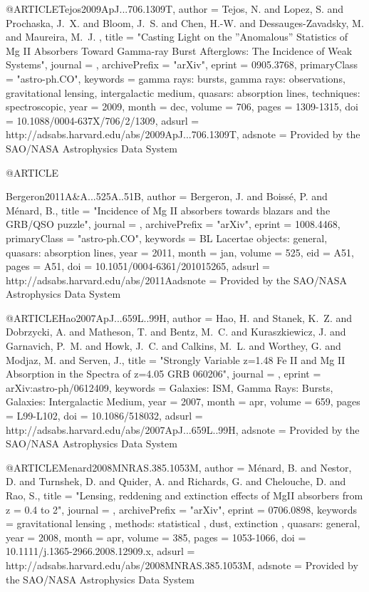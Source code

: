 \documentclass[twocolumn]{aastex62}
\begin{document}
{{{{{{{{{{{@ARTICLE{Tejos2009ApJ...706.1309T,
   author = {{Tejos}, N. and {Lopez}, S. and {Prochaska}, J.~X. and {Bloom}, J.~S. and 
	{Chen}, H.-W. and {Dessauges-Zavadsky}, M. and {Maureira}, M.~J.
	},
    title = "{Casting Light on the ''Anomalous'' Statistics of Mg II Absorbers Toward Gamma-ray Burst Afterglows: The Incidence of Weak Systems}",
  journal = {\apj},
archivePrefix = "arXiv",
   eprint = {0905.3768},
 primaryClass = "astro-ph.CO",
 keywords = {gamma rays: bursts, gamma rays: observations, gravitational lensing, intergalactic medium, quasars: absorption lines, techniques: spectroscopic},
     year = 2009,
    month = dec,
   volume = 706,
    pages = {1309-1315},
      doi = {10.1088/0004-637X/706/2/1309},
   adsurl = {http://adsabs.harvard.edu/abs/2009ApJ...706.1309T},
  adsnote = {Provided by the SAO/NASA Astrophysics Data System}
}


@ARTICLE{Bergeron2011A&A...525A..51B,
   author = {{Bergeron}, J. and {Boiss{\'e}}, P. and {M{\'e}nard}, B.},
    title = "{Incidence of Mg II absorbers towards blazars and the GRB/QSO puzzle}",
  journal = {\aap},
archivePrefix = "arXiv",
   eprint = {1008.4468},
 primaryClass = "astro-ph.CO",
 keywords = {BL Lacertae objects: general, quasars: absorption lines},
     year = 2011,
    month = jan,
   volume = 525,
      eid = {A51},
    pages = {A51},
      doi = {10.1051/0004-6361/201015265},
   adsurl = {http://adsabs.harvard.edu/abs/2011Aadsnote = {Provided by the SAO/NASA Astrophysics Data System}
}

@ARTICLE{Hao2007ApJ...659L..99H,
   author = {{Hao}, H. and {Stanek}, K.~Z. and {Dobrzycki}, A. and {Matheson}, T. and 
	{Bentz}, M.~C. and {Kuraszkiewicz}, J. and {Garnavich}, P.~M. and 
	{Howk}, J.~C. and {Calkins}, M.~L. and {Worthey}, G. and {Modjaz}, M. and 
	{Serven}, J.},
    title = "{Strongly Variable z=1.48 Fe II and Mg II Absorption in the Spectra of z=4.05 GRB 060206}",
  journal = {\apjl},
   eprint = {arXiv:astro-ph/0612409},
 keywords = {Galaxies: ISM, Gamma Rays: Bursts, Galaxies: Intergalactic Medium},
     year = 2007,
    month = apr,
   volume = 659,
    pages = {L99-L102},
      doi = {10.1086/518032},
   adsurl = {http://adsabs.harvard.edu/abs/2007ApJ...659L..99H},
  adsnote = {Provided by the SAO/NASA Astrophysics Data System}
}


@ARTICLE{Menard2008MNRAS.385.1053M,
   author = {{M{\'e}nard}, B. and {Nestor}, D. and {Turnshek}, D. and {Quider}, A. and 
	{Richards}, G. and {Chelouche}, D. and {Rao}, S.},
    title = "{Lensing, reddening and extinction effects of MgII absorbers from z = 0.4 to 2}",
  journal = {\mnras},
archivePrefix = "arXiv",
   eprint = {0706.0898},
 keywords = {gravitational lensing , methods: statistical , dust, extinction , quasars: general},
     year = 2008,
    month = apr,
   volume = 385,
    pages = {1053-1066},
      doi = {10.1111/j.1365-2966.2008.12909.x},
   adsurl = {http://adsabs.harvard.edu/abs/2008MNRAS.385.1053M},
  adsnote = {Provided by the SAO/NASA Astrophysics Data System}
}



}}}}}}}}}}}}
\end{document}
